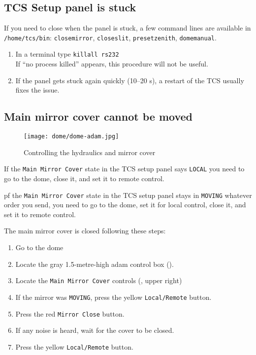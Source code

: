 \documentclass[11pt,fleqn,a4paper]{book}
\begin{document}
\subsection{TCS Setup panel is stuck}

If you need to close when the panel is stuck, a few command lines are available in \texttt{/home/tcs/bin}: \texttt{closemirror}, \texttt{closeslit}, \texttt{presetzenith}, \texttt{domemanual}. 

\label{proc:unstuckTCSpanel}
\begin{enumerate}
  \item In a terminal type \texttt{killall rs232}\\
        If ``no process killed'' appears, this procedure will not be useful.
  \item If the panel gets stuck again quickly (10--20 s), a restart of the TCS usually fixes the issue. 
\end{enumerate}

\subsection{Main mirror cover cannot be moved}
\begin{figure}
\centering
\texttt{[image: dome/dome-adam.jpg]}
\caption{Controlling the hydraulics and mirror cover}
\label{fig:dome-adam}
\end{figure}

If the \texttt{Main Mirror Cover} state in the \gls{TCS setup panel} says
\texttt{LOCAL} you need to go to the dome, close it, and set it
to remote control.

pf the \texttt{Main Mirror Cover} state in the \gls{TCS setup panel} stays in
\texttt{MOVING} whatever order you send, you need to go to the dome, set it for local control, close it, and set it to remote control.
 

The \gls{main mirror} cover is closed following these steps:
\begin{enumerate}
   \item Go to the \gls{dome}
   \item Locate the gray 1.5-metre-high \gls{adam} control box ().
   \item Locate the \texttt{Main Mirror Cover} controls (, upper right) 
   \item If the mirror was \texttt{MOVING}, press the yellow \texttt{Local/Remote} button.
   \item Press the red \texttt{Mirror Close} button.
   \item If any noise is heard, wait for the cover to be closed.
   \item Press the yellow \texttt{Local/Remote} button.
\end{enumerate} 
\end{document}
